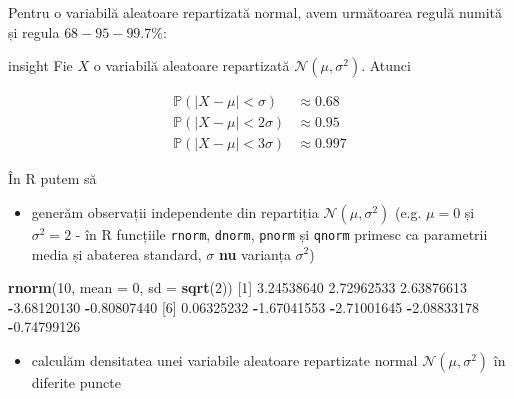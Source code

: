 \documentclass[]{article}
\newenvironment{Shaded}{\begin{snugshade}}{\end{snugshade}}
\newcommand{\KeywordTok}[1]{\textcolor[rgb]{0.13,0.29,0.53}{\textbf{#1}}}
\newcommand{\DataTypeTok}[1]{\textcolor[rgb]{0.13,0.29,0.53}{#1}}
\newcommand{\DecValTok}[1]{\textcolor[rgb]{0.00,0.00,0.81}{#1}}
\newcommand{\FloatTok}[1]{\textcolor[rgb]{0.00,0.00,0.81}{#1}}
\newcommand{\OperatorTok}[1]{\textcolor[rgb]{0.81,0.36,0.00}{\textbf{#1}}}
\newcommand{\NormalTok}[1]{#1}
\providecommand{\tightlist}{%
  \setlength{\itemsep}{0pt}\setlength{\parskip}{0pt}}
\newenvironment{frshaded_insight*}{%
  \def\FrameCommand{\fboxrule=\FrameRule\fboxsep=\FrameSep \fcolorbox{framecolor_insight}{shadecolor_insight}}%
  \MakeFramed {\advance\hsize-\width \FrameRestore}}%
{\endMakeFramed}
\newenvironment{rmdblock_insight}[1]
  {\begin{frshaded_insight*}
  \begin{itemize}
  \renewcommand{\labelitemi}{
    \raisebox{-.7\height}[0pt][0pt]{
      {\setkeys{Gin}{width=2em,keepaspectratio}\texttt{[image: images/icons/\#1]}}
    }
  }
  \item
  }
  {
  \end{itemize}
  \end{frshaded_insight*}
  }
\newenvironment{rmdinsight}
  {\begin{rmdblock_insight}{insight}}
  {\end{rmdblock_insight}}
\begin{document}
Pentru o variabilă aleatoare repartizată normal, avem următoarea regulă
numită și regula \(68-95-99.7\%\):

\begin{rmdinsight}
Fie \(X\) o variabilă aleatoare repartizată
\(\mathcal{N}(\mu, \sigma^2)\). Atunci

\begin{align*}
  \mathbb{P}(|X-\mu|<\sigma) &\approx 0.68\\
  \mathbb{P}(|X-\mu|<2\sigma) &\approx 0.95\\
  \mathbb{P}(|X-\mu|<3\sigma) &\approx 0.997
\end{align*}
\end{rmdinsight}

În R putem să

\begin{itemize}
\tightlist
\item
  generăm observații independente din repartiția
  \(\mathcal{N}(\mu, \sigma^2)\) (e.g. \(\mu = 0\) și \(\sigma^2 = 2\) -
  în R funcțiile \texttt{rnorm}, \texttt{dnorm}, \texttt{pnorm} și
  \texttt{qnorm} primesc ca parametrii media și abaterea standard,
  \(\sigma\) \textbf{nu} varianța \(\sigma^2\))
\end{itemize}

\begin{Shaded}
\begin{Highlighting}[]
\KeywordTok{rnorm}\NormalTok{(}\DecValTok{10}\NormalTok{, }\DataTypeTok{mean =} \DecValTok{0}\NormalTok{, }\DataTypeTok{sd =} \KeywordTok{sqrt}\NormalTok{(}\DecValTok{2}\NormalTok{))}
\NormalTok{ [}\DecValTok{1}\NormalTok{]  }\FloatTok{3.24538640}  \FloatTok{2.72962533}  \FloatTok{2.63876613} \OperatorTok{-}\FloatTok{3.68120130} \OperatorTok{-}\FloatTok{0.80807440}
\NormalTok{ [}\DecValTok{6}\NormalTok{]  }\FloatTok{0.06325232} \OperatorTok{-}\FloatTok{1.67041553} \OperatorTok{-}\FloatTok{2.71001645} \OperatorTok{-}\FloatTok{2.08833178} \OperatorTok{-}\FloatTok{0.74799126}
\end{Highlighting}
\end{Shaded}

\begin{itemize}
\tightlist
\item
  calculăm densitatea unei variabile aleatoare repartizate normal
  \(\mathcal{N}(\mu, \sigma^2)\) în diferite puncte
\end{itemize}
\end{document}
